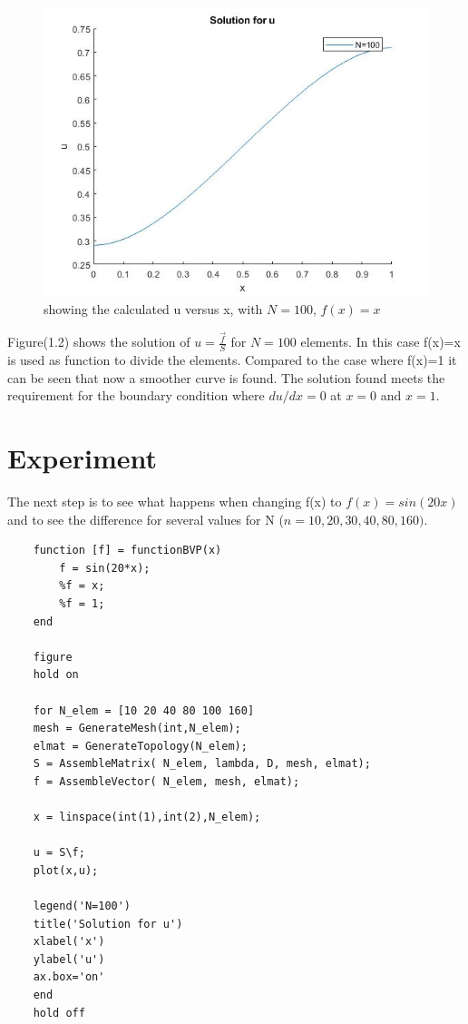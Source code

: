 \documentclass[a4paper]{report}
\begin{document}
\begin{figure}[ht!]
	\centering
	\includegraphics[width=140mm]{1Dfx.jpg}
	\caption{showing the calculated u versus x, with $N = 100$, $f(x)=x$		 \label{overflow}}
\end{figure}

Figure(1.2) shows the solution of $u=\frac{\vec{f}}{S}$ for $N=100$ elements. In this case f(x)=x is used as function to divide the elements. Compared to the case where f(x)=1 it can be seen that now a smoother curve is found. The solution found meets the requirement for the boundary condition where $du/dx=0$ at $x=0$ and $x=1$.

\vfill
\section{Experiment}

The next step is to see what happens when changing f(x) to $f(x)=sin(20x)$ and to see the difference for several values for N ($n=10,20,30,40,80,160)$.

\vspace{5mm}
\begin{lstlisting}
	function [f] = functionBVP(x)
		f = sin(20*x);
		%f = x;
		%f = 1;
	end
	
	figure 
	hold on
	
	for N_elem = [10 20 40 80 100 160]
	mesh = GenerateMesh(int,N_elem);
	elmat = GenerateTopology(N_elem);
	S = AssembleMatrix( N_elem, lambda, D, mesh, elmat);
	f = AssembleVector( N_elem, mesh, elmat);
	
	x = linspace(int(1),int(2),N_elem);
	
	u = S\f;
	plot(x,u);
	
	legend('N=100')
	title('Solution for u')
	xlabel('x')
	ylabel('u')
	ax.box='on'
	end
	hold off
\end{lstlisting}
\end{document}
